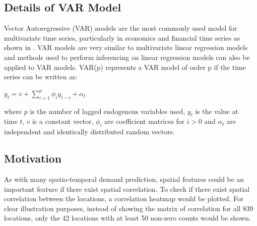 \documentclass[nonblindrev,msom]{informs3} %
\begin{document}
\subsection{Details of VAR Model}
Vector Autoregressive (VAR) models are the most commonly used model for multivariate time series, particularly in economics and financial time series as shown in \cite{Hilde2000}. VAR models are very similar to multivariate linear regression models and methods used to perform inferencing on linear regression models can also be applied to VAR models. VAR(p) represents a VAR model of order p if the time series can be written as: 

\begin{center}
    $\displaystyle y_t=v+\sum_{i=1}^{p} \phi_{i}y_{t-i}+\alpha_t$
\end{center}

\noindent where $p$ is the number of lagged endogenous variables used, $y_t$ is the value at time $t$, $v$ is a constant vector, $\phi_i$ are coefficient matrices for $i>0$ and $\alpha_t$ are independent and identically distributed random vectors. 

\subsection{Motivation}

As with many spatio-temporal demand prediction, spatial features could be an important feature if there exist spatial correlation. To check if there exist spatial correlation between the locations, a correlation heatmap would be plotted. For clear illustration purposes, instead of showing the matrix of correlation for all 839 locations, only the 42 locations with at least 50 non-zero counts would be shown. 
\end{document}
